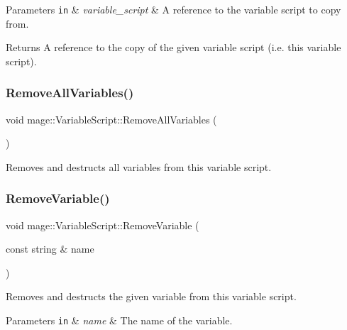 \begin{DoxyParams}[1]{Parameters}
\mbox{\tt in}  & {\em variable\+\_\+script} & A reference to the variable script to copy from. \\
\hline
\end{DoxyParams}
\begin{DoxyReturn}{Returns}
A reference to the copy of the given variable script (i.\+e. this variable script). 
\end{DoxyReturn}
\hypertarget{classmage_1_1_variable_script_ac9575fb5f2ca445d9bcf23b63d00124e}{}\label{classmage_1_1_variable_script_ac9575fb5f2ca445d9bcf23b63d00124e} 
\subsubsection{\texorpdfstring{Remove\+All\+Variables()}{RemoveAllVariables()}}
{\footnotesize\ttfamily void mage\+::\+Variable\+Script\+::\+Remove\+All\+Variables (\begin{DoxyParamCaption}{ }\end{DoxyParamCaption})}

Removes and destructs all variables from this variable script. \hypertarget{classmage_1_1_variable_script_a4970ef4faafb1a6a43c4648ec9f36cce}{}\label{classmage_1_1_variable_script_a4970ef4faafb1a6a43c4648ec9f36cce} 
\subsubsection{\texorpdfstring{Remove\+Variable()}{RemoveVariable()}}
{\footnotesize\ttfamily void mage\+::\+Variable\+Script\+::\+Remove\+Variable (\begin{DoxyParamCaption}\item[{const string \&}]{name }\end{DoxyParamCaption})}

Removes and destructs the given variable from this variable script.


\begin{DoxyParams}[1]{Parameters}
\mbox{\tt in}  & {\em name} & The name of the variable. \\
\hline
\end{DoxyParams}
\hypertarget{classmage_1_1_variable_script_a1b6daa6b226e43564408ab54e4c65eb7}{}\label{classmage_1_1_variable_script_a1b6daa6b226e43564408ab54e4c65eb7} 
